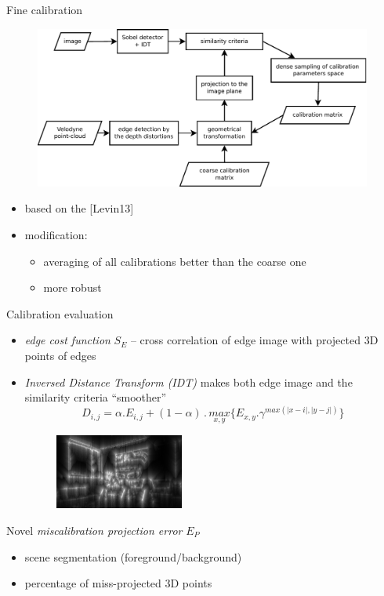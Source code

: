 \documentclass[pdf]{beamer}
\begin{document}
	\begin{frame}{Fine calibration}
		\begin{figure}[h]
			\center
			\includegraphics[width=0.99\textwidth]{fig/framework.pdf}
		\end{figure}
		\begin{itemize}
			\item based on the [Levin13]
			\item modification:
			\begin{itemize}
				\item averaging of all calibrations better than the coarse one
				\item more robust
			\end{itemize}
		\end{itemize}
	\end{frame}	

	\begin{frame}{Calibration evaluation}
		\begin{itemize}
			\item \emph{edge cost function} $S_E$ -- cross correlation of edge image with projected $3$D points of edges
			\item \emph{Inversed Distance Transform (IDT)} makes both edge image and the similarity criteria ``smoother''
			$$
				D_{i,j} = \alpha . E_{i,j} + (1-\alpha)\,.\,\underset{x,y}{max}\{ E_{x,y} . \gamma^{max(\vert x-i \vert, \vert y-j \vert)}\}
			$$
			\begin{figure}[h]
				\center
				\includegraphics[width=0.4\textwidth]{fig/edges_idt.png}
			\end{figure}
		\end{itemize}
		
		\begin{block}{Novel \emph{miscalibration projection error} $E_P$}
			\begin{itemize}
				\item scene segmentation (foreground/background)
				\item percentage of miss-projected $3$D points
			\end{itemize}
		\end{block}
	
	\end{frame}
	
\end{document}
